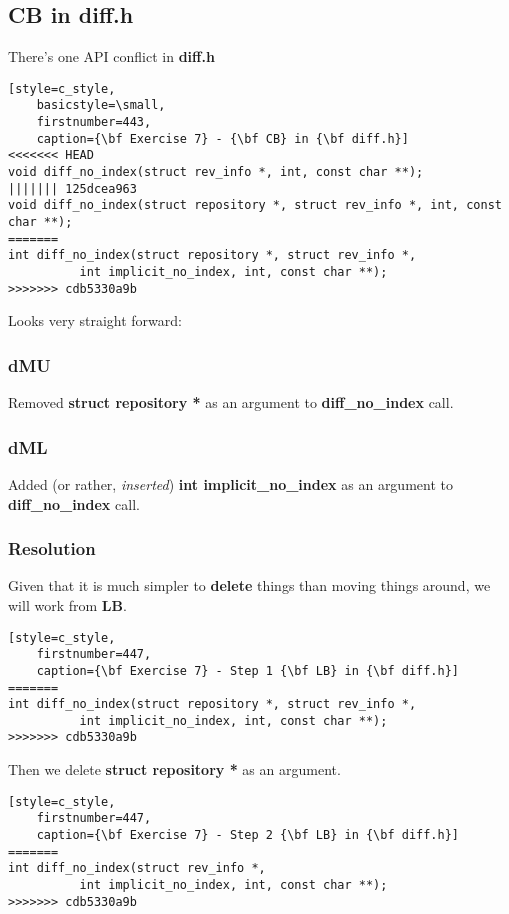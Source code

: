 \subsection*{CB in diff.h}

There's one API conflict in {\bf diff.h}

\begin{lstlisting}[style=c_style,
	basicstyle=\small,
	firstnumber=443,
	caption={\bf Exercise 7} - {\bf CB} in {\bf diff.h}]
<<<<<<< HEAD
void diff_no_index(struct rev_info *, int, const char **);
||||||| 125dcea963
void diff_no_index(struct repository *, struct rev_info *, int, const char **);
=======
int diff_no_index(struct repository *, struct rev_info *,
		  int implicit_no_index, int, const char **);
>>>>>>> cdb5330a9b
\end{lstlisting}

Looks very straight forward:

\subsubsection*{dMU}
Removed {\bf struct repository *} as an argument to {\bf diff\_no\_index} call.

\subsubsection*{dML}
Added (or rather, {\it inserted}) {\bf int implicit\_no\_index} as an argument to {\bf diff\_no\_index} call.

\subsubsection*{Resolution}
Given that it is much simpler to {\bf delete} things than moving things around, we will work from {\bf LB}.

\begin{lstlisting}[style=c_style,
	firstnumber=447,
	caption={\bf Exercise 7} - Step 1 {\bf LB} in {\bf diff.h}]
=======
int diff_no_index(struct repository *, struct rev_info *,
		  int implicit_no_index, int, const char **);
>>>>>>> cdb5330a9b
\end{lstlisting}

Then we delete {\bf struct repository *} as an argument.

\begin{lstlisting}[style=c_style,
	firstnumber=447,
	caption={\bf Exercise 7} - Step 2 {\bf LB} in {\bf diff.h}]
=======
int diff_no_index(struct rev_info *,
		  int implicit_no_index, int, const char **);
>>>>>>> cdb5330a9b
\end{lstlisting}


